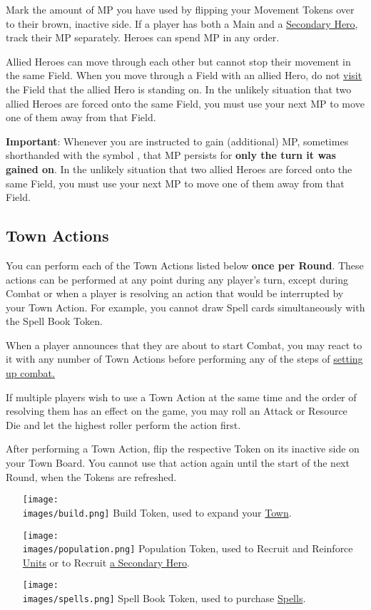 \begin{multicols*}{2}
\bigskip

Mark the amount of MP you have used by flipping your Movement Tokens over to their brown, inactive side.
If a player has both a Main and a \hyperlink{Secondary}{Secondary Hero}, track their MP separately.
Heroes can spend MP in any order.\par
Allied Heroes can move through each other but cannot stop their movement in the same Field.
When you move through a Field with an allied Hero, do not \hyperlink{Categories}{visit} the Field that the allied Hero is standing on.
In the unlikely situation that two allied Heroes are forced onto the same Field, you must use your next MP to move one of them away from that Field.\par
\textbf{Important}: Whenever you are instructed to gain (additional) MP, sometimes shorthanded with the symbol , that MP persists for \textbf{only the turn it was gained on}.
In the unlikely situation that two allied Heroes are forced onto the same Field, you must use your next MP to move one of them away from that Field.

\subsection*{Town Actions}
You can perform each of the Town Actions listed below \textbf{once per Round}.
These actions can be performed at any point during any player's turn, except during Combat or when a player is resolving an action that would be interrupted by your Town Action.
For example, you cannot draw Spell cards simultaneously with the Spell Book Token.\par
When a player announces that they are about to start Combat, you may react to it with any number of Town Actions before performing any of the steps of \hyperlink{Combatsetup}{setting up combat.}\par
If multiple players wish to use a Town Action at the same time and the order of resolving them has an effect on the game, you may roll an Attack or Resource Die and let the highest roller perform the action first.\par
After performing a Town Action, flip the respective Token on its inactive side on your Town Board.
You cannot use that action again until the start of the next Round, when the Tokens are refreshed.
\begin{itemize}
  \item [{\texttt{[image: \\images/build.png]}}] Build Token, used to expand your \hyperlink{Town}{Town}.
  \item [{\texttt{[image: \\images/population.png]}}] Population Token, used to Recruit and Reinforce \hyperlink{Units}{Units} or to Recruit \hyperlink{Secondary}{a Secondary Hero}.
  \item [{\texttt{[image: \\images/spells.png]}}]Spell Book Token, used to purchase \hyperlink{spells}{Spells}.
\end{itemize}


\end{multicols*}
